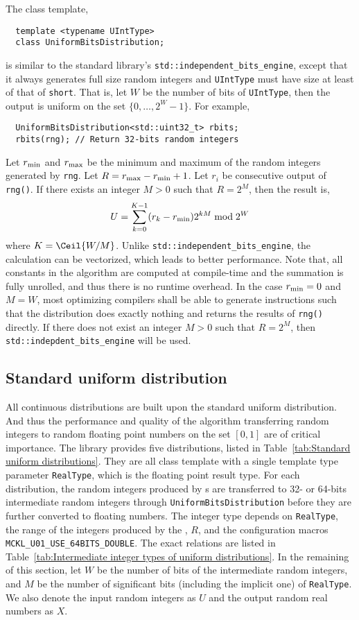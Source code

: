 The class template,
\begin{Verbatim}
  template <typename UIntType>
  class UniformBitsDistribution;
\end{Verbatim}
is similar to the standard library's \verb|std::independent_bits_engine|,
except that it always generates full size random integers and \verb|UIntType|
must have size at least of that of \verb|short|. That is, let $W$ be the number
of bits of \verb|UIntType|, then the output is uniform on the set
$\{0,\dots,2^W - 1\}$. For example,
\begin{Verbatim}
  UniformBitsDistribution<std::uint32_t> rbits;
  rbits(rng); // Return 32-bits random integers
\end{Verbatim}
Let $r_{\mathrm{min}}$ and $r_{\mathrm{max}}$ be the minimum and maximum of the random integers
generated by \verb|rng|. Let $R = r_{\mathrm{max}} - r_{\mathrm{min}} + 1$. Let $r_i$ be consecutive
output of \verb|rng()|. If there exists an integer $M > 0$ such that $R = 2^M$,
then the result is,
\begin{equation*}
  U = \sum_{k = 0}^{K - 1} (r_k - r_{\mathrm{min}}) 2^{kM} \bmod 2^W
\end{equation*}
where $K = \Ceil{W / M}$. Unlike \verb|std::independent_bits_engine|, the
calculation can be vectorized, which leads to better performance. Note that,
all constants in the algorithm are computed at compile-time and the summation
is fully unrolled, and thus there is no runtime overhead. In the case $r_{\mathrm{min}} =
0$ and $M = W$, most optimizing compilers shall be able to generate
instructions such that the distribution does exactly nothing and returns the
results of \verb|rng()| directly. If there does not exist an integer $M > 0$
such that $R = 2^M$, then \verb|std::indepdent_bits_engine| will be used.

\subsection{Standard uniform distribution}
\label{sub:Standard uniform distribution}

All continuous distributions are built upon the standard uniform distribution.
And thus the performance and quality of the algorithm transferring random
integers to random floating point numbers on the set $[0, 1]$ are of critical
importance. The library provides five distributions, listed in
Table~\ref{tab:Standard uniform distributions}. They are all class template
with a single template type parameter \verb|RealType|, which is the floating
point result type. For each distribution, the random integers produced by
\rng{}s are transferred to 32- or 64-bits intermediate random integers through
\verb|UniformBitsDistribution| before they are further converted to floating
numbers. The integer type depends on \verb|RealType|, the range of the integers
produced by the \rng{}, $R$, and the configuration macros
\verb|MCKL_U01_USE_64BITS_DOUBLE|. The exact relations are listed in
Table~\ref{tab:Intermediate integer types of uniform distributions}. In the
remaining of this section, let $W$ be the number of bits of the intermediate
random integers, and $M$ be the number of significant bits (including the
implicit one) of \verb|RealType|. We also denote the input random integers as
$U$ and the output random real numbers as $X$.

